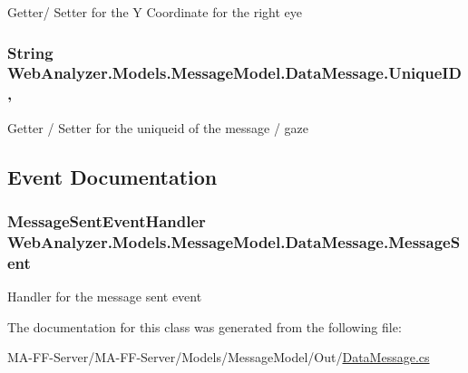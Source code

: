 Getter/ Setter for the Y Coordinate for the right eye 

\hypertarget{class_web_analyzer_1_1_models_1_1_message_model_1_1_data_message_af8ea083fd4035d8c786f5da12bc01917}{}
\subsubsection[{Unique\+I\+D}]{\setlength{\rightskip}{0pt plus 5cm}String Web\+Analyzer.\+Models.\+Message\+Model.\+Data\+Message.\+Unique\+I\+D\hspace{0.3cm}{\ttfamily [get]}, {\ttfamily [set]}}\label{class_web_analyzer_1_1_models_1_1_message_model_1_1_data_message_af8ea083fd4035d8c786f5da12bc01917}


Getter / Setter for the uniqueid of the message / gaze 



\subsection{Event Documentation}
\hypertarget{class_web_analyzer_1_1_models_1_1_message_model_1_1_data_message_a09dc25c903bc851fddabb0d075cca5f6}{}
\subsubsection[{Message\+Sent}]{\setlength{\rightskip}{0pt plus 5cm}Message\+Sent\+Event\+Handler Web\+Analyzer.\+Models.\+Message\+Model.\+Data\+Message.\+Message\+Sent}\label{class_web_analyzer_1_1_models_1_1_message_model_1_1_data_message_a09dc25c903bc851fddabb0d075cca5f6}


Handler for the message sent event 



The documentation for this class was generated from the following file\+:\begin{DoxyCompactItemize}
\item 
M\+A-\/\+F\+F-\/\+Server/\+M\+A-\/\+F\+F-\/\+Server/\+Models/\+Message\+Model/\+Out/\hyperlink{_data_message_8cs}{Data\+Message.\+cs}\end{DoxyCompactItemize}
